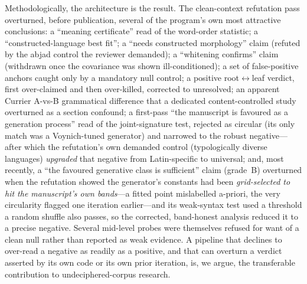 \documentclass[11pt]{article}
\begin{document}
Methodologically, the architecture is the result. The clean-context refutation pass
overturned, before publication, several of the program's own most attractive
conclusions: a ``meaning certificate'' read of the word-order statistic; a
``constructed-language best fit''; a ``needs constructed morphology'' claim (refuted by
the abjad control the reviewer demanded); a ``whitening confirms'' claim (withdrawn
once the covariance was shown ill-conditioned); a set of false-positive anchors caught
only by a mandatory null control; a positive root$\leftrightarrow$leaf verdict, first
over-claimed and then over-killed, corrected to unresolved; an apparent Currier
A-vs-B grammatical difference that a dedicated content-controlled study overturned as a
section confound; a first-pass ``the manuscript is favoured as a
generation process'' read of the joint-signature test, rejected as circular (its only
match was a Voynich-tuned generator) and narrowed to the robust negative---after which
the refutation's own demanded control (typologically diverse languages) \emph{upgraded}
that negative from Latin-specific to universal; and, most recently, a ``the favoured
generative class is sufficient'' claim (grade~B) overturned when the refutation showed the
generator's constants had been \emph{grid-selected to hit the manuscript's own bands}---a
fitted point mislabelled a-priori, the very circularity flagged one iteration earlier---and
its weak-syntax test used a threshold a random shuffle also passes, so the corrected,
band-honest analysis reduced it to a precise negative. Several mid-level probes were themselves
refused for want of a clean null rather than reported as weak evidence. A pipeline that
declines to over-read a negative as readily as a positive, and that can overturn a
verdict asserted by its own code or its own prior iteration, is, we argue, the
transferable contribution to undeciphered-corpus research.
\end{document}
